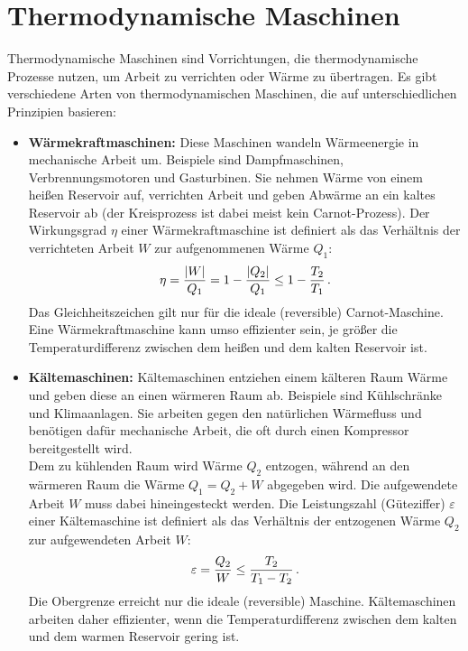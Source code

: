 \section{Thermodynamische Maschinen}\label{sec: thermodynamische_maschinen}
Thermodynamische Maschinen sind Vorrichtungen, die thermodynamische Prozesse nutzen, um Arbeit zu verrichten oder Wärme zu übertragen. Es gibt verschiedene Arten von thermodynamischen Maschinen, die auf unterschiedlichen Prinzipien basieren:
\begin{itemize}
    \item \textbf{Wärmekraftmaschinen:} Diese Maschinen wandeln Wärmeenergie in mechanische Arbeit um. Beispiele sind Dampfmaschinen, Verbrennungsmotoren und Gasturbinen. Sie nehmen Wärme von einem heißen Reservoir auf, verrichten Arbeit und geben Abwärme an ein kaltes Reservoir ab (der Kreisprozess ist dabei meist kein Carnot-Prozess). Der Wirkungsgrad $\eta$ einer Wärmekraftmaschine ist definiert als das Verhältnis der verrichteten Arbeit $W$ zur aufgenommenen Wärme $Q_1$:
    \begin{equation}
        \eta = \frac{|W|}{Q_1} = 1 - \frac{|Q_2|}{Q_1} \le 1 - \frac{T_2}{T_1} \,.
    \end{equation}
    Das Gleichheitszeichen gilt nur für die ideale (reversible) Carnot-Maschine. Eine Wärmekraftmaschine kann umso effizienter sein, je größer die Temperaturdifferenz zwischen dem heißen und dem kalten Reservoir ist.

    \item \textbf{Kältemaschinen:} Kältemaschinen entziehen einem kälteren Raum Wärme und geben diese an einen wärmeren Raum ab. Beispiele sind Kühlschränke und Klimaanlagen. Sie arbeiten gegen den natürlichen Wärmefluss und benötigen dafür mechanische Arbeit, die oft durch einen Kompressor bereitgestellt wird. \\
    Dem zu kühlenden Raum wird Wärme $Q_2$ entzogen, während an den wärmeren Raum die Wärme $Q_1 = Q_2 + W$ abgegeben wird. Die aufgewendete Arbeit $W$ muss dabei hineingesteckt werden. Die Leistungszahl (Güteziffer) $\varepsilon$ einer Kältemaschine ist definiert als das Verhältnis der entzogenen Wärme $Q_2$ zur aufgewendeten Arbeit $W$:
    \begin{equation}
        \varepsilon = \frac{Q_2}{W} \le \frac{T_2}{T_1 - T_2} \,.
    \end{equation} 
    Die Obergrenze erreicht nur die ideale (reversible) Maschine. Kältemaschinen arbeiten daher effizienter, wenn die Temperaturdifferenz zwischen dem kalten und dem warmen Reservoir gering ist.


\end{itemize}
